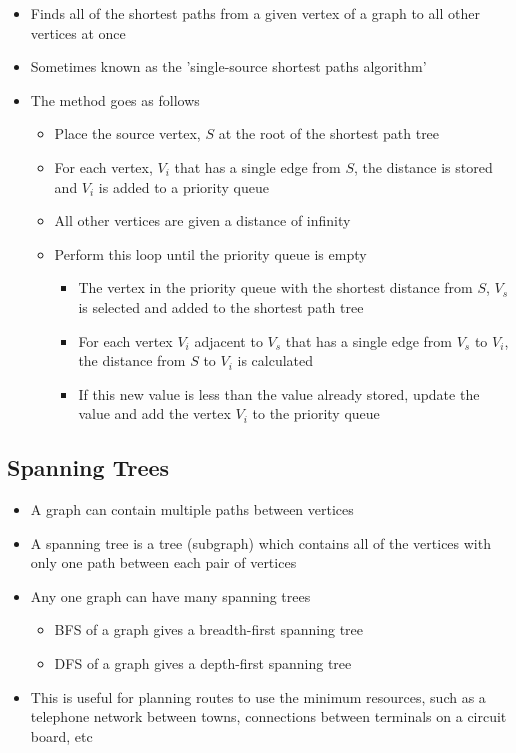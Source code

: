 \begin{itemize}
  \item Finds all of the shortest paths from a given vertex of a graph to all other vertices at once
  \item Sometimes known as the 'single-source shortest paths algorithm'
  \item The method goes as follows
  \begin{itemize}
    \item Place the source vertex, $S$ at the root of the shortest path tree
    \item For each vertex, $V_i$ that has a single edge from $S$, the distance is stored and $V_i$ is added to a priority queue
    \item All other vertices are given a distance of infinity
    \item Perform this loop until the priority queue is empty
    \begin{itemize}
      \item The vertex in the priority queue with the shortest distance from $S$, $V_s$ is selected and added to the shortest path tree
      \item For each vertex $V_i$ adjacent to $V_s$ that has a single edge from $V_s$ to $V_i$, the distance from $S$ to $V_i$ is calculated
      \item If this new value is less than the value already stored, update the value and add the vertex $V_i$ to the priority queue
    \end{itemize}
  \end{itemize}
\end{itemize}

\subsection*{Spanning Trees}

\begin{itemize}
  \item A graph can contain multiple paths between vertices
  \item A spanning tree is a tree (subgraph) which contains all of the vertices with only one path between each pair of vertices
  \item Any one graph can have many spanning trees
  \begin{itemize}
    \item BFS of a graph gives a breadth-first spanning tree
    \item DFS of a graph gives a depth-first spanning tree
  \end{itemize}
  \item This is useful for planning routes to use the minimum resources, such as a telephone network between towns, connections between terminals on a circuit board, etc
\end{itemize}

